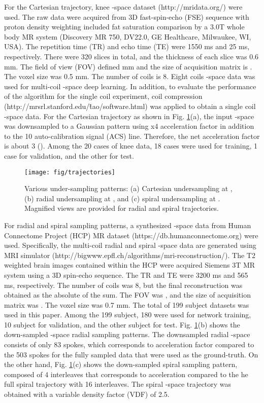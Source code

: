 \documentclass[10pt,journal]{IEEEtran}
\newcommand{\0}{{\boldsymbol{0}}}
\begin{document}
For the Cartesian trajectory, knee -space dataset (http://mridata.org/) were used. The raw data were acquired from 3D fast-spin-echo (FSE) sequence with proton density weighting included fat saturation comparison by a 3.0T whole body MR system (Discovery MR 750, DV22.0, GE Healthcare, Milwaukee, WI, USA). The repetition time (TR) and echo time (TE) were 1550 ms and 25 ms, respectively. There were 320 slices in total, and the thickness of each slice was 0.6 mm. The field of view (FOV) defined  mm and the size of acquisition matrix is . The voxel size was 0.5 mm. The number of coils is 8. Eight coils -space data was used for multi-coil -space deep learning. 
In addition, to evaluate the performance of the algorithm  for the single coil experiment,  coil compression (http://mrsrl.stanford.edu/\~tao/software.html) was applied to obtain a single coil -space data. 
For the Cartesian trajectory as shown in Fig. \ref{fig:trajectories}(a), the input -space was downsampled to a Gaussian pattern using x4 acceleration factor in addition to the 10 auto-calibration signal (ACS) line. Therefore, the net acceleration factor is about 3 (). 
Among the 20  cases of knee data,  18 cases were used for training, 1 case for validation, and the other for test.


\begin{figure}[!t] 	
\centering
{\texttt{[image: fig/trajectories]}}
\caption{Various under-sampling patterns: (a) Cartesian undersampling at , (b) radial undersampling at , and (c) spiral undersampling at .
Magnified views are provided for radial and spiral trajectories. }
\label{fig:trajectories}
\end{figure}



For radial and spiral sampling patterns, a synthesized -space data from Human Connectome Project (HCP) MR dataset (https://db.humanconnectome.org) were used.
Specifically, the multi-coil radial and spiral -space data are generated using MRI simulator (http://bigwww.epfl.ch/algorithms/mri-reconstruction/).
The T2 weighted brain images contained within the HCP were acquired Siemens 3T MR system using a 3D spin-echo sequence. The TR and TE were 3200 ms and 565 ms, respectively. The number of coils was 8, but the final reconstruction was obtained as the absolute of the sum. 
The FOV was , and the size of acquisition matrix was . The voxel size was 0.7 mm. 
The total of 199 subject datasets was used in this paper. Among the 199 subject, 180 were used for network training,  10 subject  for validation, and the other subject  for test.
Fig. \ref{fig:trajectories}(b) shows the down-sampled -space radial sampling patterns. 
The  downsampled radial -space consists of only 83 spokes, which corresponds to 
 acceleration factor compared to the 503 spokes for the fully sampled data that were used as the ground-truth.
On the other hand,  Fig. \ref{fig:trajectories}(c) shows the down-sampled spiral sampling pattern, composed of
4 interleaves that corresponds to  acceleration compared to the
he full spiral trajectory with 16 interleaves. The spiral -space trajectory was obtained with a variable density factor (VDF) of 2.5. 
\end{document}
